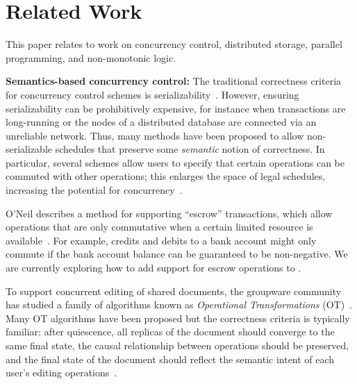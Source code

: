 \section{Related Work}
\label{sec:relwork}

This paper relates to work on concurrency control, distributed storage, parallel
programming, and non-monotonic logic.

\vspace{0.5em}\noindent
\textbf{Semantics-based concurrency control:} The traditional correctness
criteria for concurrency control schemes is
serializability~\cite{Papadimitriou1979}. However, ensuring serializability can
be prohibitively expensive, for instance when transactions are long-running or
the nodes of a distributed database are connected via an unreliable
network. Thus, many methods have been proposed to allow non-serializable
schedules that preserve some \emph{semantic} notion of correctness. In
particular, several schemes allow users to specify that certain operations can
be commuted with other operations; this enlarges the space of legal schedules,
increasing the potential for concurrency~\cite{Farrag1989,Garcia-Molina1983,Weihl1988}.


O'Neil describes a method for supporting ``escrow'' transactions, which allow
operations that are only commutative when a certain limited resource is
available~\cite{O'Neil1986}. For example, credits and debits to a bank account
might only commute if the bank account balance can be guaranteed to be
non-negative. We are currently exploring how to add support for escrow
operations to \lang.


To support concurrent editing of shared documents, the groupware community has
studied a family of algorithms known as \emph{Operational Transformations}
(OT)~\cite{Ellis1989,Sun1998}. Many OT algorithms have been proposed but the
correctness criteria is typically familiar: after quiescence, all replicas of the
document should converge to the same final state, the causal relationship
between operations should be preserved, and the final state of the document
should reflect the semantic intent of each user's editing
operations~\cite{Sun1998a}.

